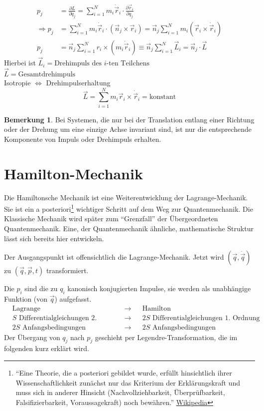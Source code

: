 \documentclass[oneside]{book}
\theoremstyle{definition}
\newtheorem*{bemerkung*}{Bemerkung}
\newcommand{\dotvec}[1]{\dot{\vec{#1}}}
\newcommand{\const}{\text{konstant}}
\begin{document}
\begin{align*}
	p_j &= \frac{\partial L}{\partial \dot q_j} = \sum\limits_{i=1}^Nm_i \dot {\vec r}_i \cdot \frac{\partial \vec r_i}{\partial q_j}\\
	\Rightarrow p_j &= \sum\limits_{i=1}^N m_i \dot {\vec r}_i \cdot (\vec n_j \times \vec r_i) = \vec n_j \sum\limits_{i=1}^N m_i (\vec r_i \times \dot {\vec r}_i)\\
	p_j &= \vec n_j \sum\limits_{i=1}^N r_i \times (m_i\dot{\vec r}_i) \equiv \vec n_j \sum\limits_{i=1}^N \vec L_i = \vec n_j \cdot \vec L
\end{align*}
Hierbei ist
$\vec L_i = \text{Drehimpuls des $i$-ten Teilchens}$\\
$\vec L = \text{Gesamtdrehimpuls}$\\
Isotropie  $\Leftrightarrow$ Drehimpulserhaltung
\[\vec L = \sum\limits_{i=1}^Nm_i \vec r_i \times \dotvec r_i = \const \]
\begin{bemerkung*}
	Bei Systemen, die nur bei der Translation entlang einer Richtung oder der Drehung um eine einzige Achse invariant sind, ist nur die entsprechende Komponente von Impuls oder Drehimpuls erhalten.
\end{bemerkung*}

\section{Hamilton-Mechanik}
Die Hamiltonsche Mechanik ist eine Weiterentwicklung der Lagrange-Mechanik. Sie ist ein a posteriori\footnote{"`Eine Theorie, die a posteriori gebildet wurde, erfüllt hinsichtlich ihrer Wissenschaftlichkeit zunächst nur das Kriterium der Erklärungskraft und muss sich in anderer Hinsicht (Nachvollziehbarkeit, Überprüfbarkeit, Falsifizierbarkeit, Voraussagekraft) noch bewähren."' \href{https://de.wikipedia.org/wiki/A_posteriori}{Wikipedia}} wichtiger Schritt auf dem Weg zur Quantenmechanik. Die Klassische Mechanik wird später zum "`Grenzfall"' der Übergeordneten Quantenmechanik. Eine, der Quantenmechanik ähnliche, mathematische Struktur lässt sich bereits hier entwickeln.

Der Ausgangspunkt ist offensichtlich die Lagrange-Mechanik. Jetzt wird $(\vec q, \dot {\vec q})$ zu $(\vec q, \vec p, t)$ transformiert.

Die $p_i$ sind die zu $q_i$ kanonisch konjugierten Impulse, sie werden als unabhängige Funktion (von $\vec q$) aufgefasst.
\begin{align*}
&\text{Lagrange} &\to& &\text{Hamilton}\\
&\text{$S$ Differentialgleichungen 2. Ordnung} &\to& &\text{$2S$ Differentialgleichungen 1. Ordnung}\\
&\text{$2S$ Anfangsbedingungen} &\to& &\text{$2S$ Anfangsbedingungen}
\end{align*}
Der Übergang von $q_j$ nach $p_j$ geschieht per Legendre-Transformation, die im folgenden kurz erklärt wird.
\end{document}
